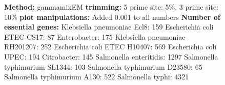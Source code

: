\documentclass[a4paper,10pt]{article}
\begin{document}
\begin{figure}
{\textbf{Method:} gammamixEM \newline
\textbf{trimming:} 5 prime site: 5\%, 3 prime site: 10\%\newline
\textbf{plot manipulations:} Added 0.001 to all numbers \newline
\textbf{Number of essential genes:}\newline
Klebsiella pneumoniae Ecl8: 159 \newline
Escherichia coli ETEC CS17: 87 \newline
Enterobacter: 175 \newline
Klebsiella pneumoniae RH201207: 252 \newline
Escherichia coli ETEC H10407: 569 \newline
Escherichia coli UPEC: 194 \newline
Citrobacter: 145 \newline
Salmonella enteritidis: 1297 \newline
Salmonella typhimurium SL1344: 103 \newline
Salmonella typhimurium D23580: 65 \newline
Salmonella typhimurium A130: 522 \newline
Salmonella typhi: 4321}
\end{figure}
\end{document}
